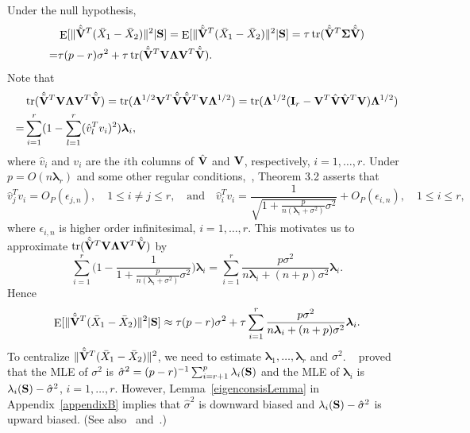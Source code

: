 \documentclass[review]{elsarticle}
\DeclareMathOperator{\mytr}{tr}
\DeclareMathOperator{\myE}{E}
\newcommand{\bfsym}[1]{\ensuremath{\boldsymbol{#1}}}
\def\blambda {\bfsym {\lambda}}        \def\bLambda {\bfsym {\Lambda}}
\theoremstyle{plain}
\theoremstyle{definition}
\theoremstyle{remark}
\begin{document}
Under the null hypothesis, 
\begin{equation*}
    \begin{aligned}
        &\myE [\|\hat{\tilde{\BV}}^T (\bar{X}_1-\bar{X}_2)\|^2|\BS]
        = \myE[ \|\hat{\tilde{\BV}}^T (\bar{X}_1-\bar{X}_2)\|^2 |\BS]
        =
\tau \mytr(\hat{\tilde{\BV}}^T\bSigma\hat{\tilde{\BV}})\\
        =&
\tau (p-r) \sigma^2+
\tau \mytr(\hat{\tilde{\BV}}^T\BV \bLambda \BV^T\hat{\tilde{\BV}}).%
    \end{aligned}
\end{equation*}
Note that
$$
\begin{aligned}
    &\mytr(\hat{\tilde{\BV}}^T\BV \bLambda \BV^T\hat{\tilde{\BV}})
=
\mytr( \bLambda^{1/2} \BV^T\hat{\tilde{\BV}}\hat{\tilde{\BV}}^T\BV \bLambda^{1/2} )
=
\mytr( \bLambda^{1/2} (\BI_r-\BV^T\hat{\BV}\hat{\BV}^T\BV) \bLambda^{1/2} )\\
    =&
    \sum_{i=1}^r  (1-\sum_{l=1}^r (\hat{v}_l^T v_i)^2)\blambda_i,
\end{aligned}
$$
where $\hat{v}_i$ and $v_i$ are the $i$th columns of $\hat{\mathbf{V}}$ and $\mathbf{V}$, respectively, $i=1,\ldots, r$.
Under $p=O(n\blambda_r)$ and some other regular conditions,~\cite{Fan2015Asymptotics}, Theorem 3.2 asserts that 
$$
\hat{v}_j^T v_i=O_P(\epsilon_{j,n}),\quad 1\leq i\neq j\leq r,
\quad \text{and}\quad
\hat{v}_i^T v_i=\frac{1}{\sqrt{1+ \frac{p}{n(\blambda_i+\sigma^2)}\sigma^2}}+O_P(\epsilon_{i,n}),\quad 1\leq i\leq r,
$$
where $\epsilon_{i,n}$ is higher order infinitesimal, $i=1,\ldots, r$.
This motivates us to approximate $\mytr(\hat{\tilde{\BV}}^T\BV \bLambda \BV^T\hat{\tilde{\BV}})$
by
$$
\sum_{i=1}^r \Big(1-\frac{1}{1+\frac{p}{n(\blambda_i+\sigma^2)}\sigma^2}\Big)\blambda_i
=
\sum_{i=1}^r \frac{p\sigma^2}{n\blambda_i+(n+p)\sigma^2}\blambda_i.
$$
Hence 
$$
\myE [\|\hat{\tilde{\BV}}^T (\bar{X}_1-\bar{X}_2)\|^2|\BS]
\approx
\tau(p-r)\sigma^2 + \tau\sum_{i=1}^r \frac{p\sigma^2}{n\blambda_i+(n+p)\sigma^2}\blambda_i.
$$
To centralize $\|\hat{\tilde{\mathbf{V}}}^T (\bar{X}_1-\bar{X}_2)\|^2$, we need to estimate $\blambda_1,\ldots, \blambda_r$ and $\sigma^2$.
~\cite{Anderson1986Asymptotic} proved that the MLE of $\sigma^2$ is $\hat{\sigma}^2=(p-r)^{-1}\sum_{i=r+1}^p \lambda_i(\mathbf{S})$ and the MLE of $\blambda_i$ is $\lambda_i(\mathbf{S})-\hat{\sigma}^2$, $i=1,\ldots, r$.
However, Lemma~\ref{eigenconsisLemma} in Appendix~\ref{appendixB} implies that $\hat{\sigma}^2$ is downward biased and $\lambda_i(\mathbf{S})-\hat{\sigma}^2$ is upward biased.
(See also~\cite{Passemier2015} and~\cite{Fan2015Asymptotics}.)
\end{document}
